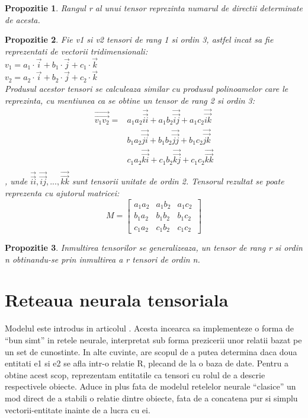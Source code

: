 \documentclass{article}
\newtheorem{prop}{Propozitie}[section]
\begin{document}
\begin{prop}
Rangul r al unui tensor reprezinta numarul de directii determinate de acesta. \cite{Tensor_Rank}
\end{prop}

\begin{prop}
	Fie v1 si v2 tensori de rang 1 si ordin 3, astfel incat sa fie reprezentati de vectorii tridimensionali:\\
	$v_1 = a_1 \cdot \vec{i} + b_1 \cdot \vec{j} + c_1 \cdot \vec{k}$\\
	$v_2 = a_2 \cdot \vec{i} + b_2 \cdot \vec{j} + c_2 \cdot \vec{k}$\\
	Produsul acestor tensori \cite{Tensor_Multiplication} se calculeaza similar cu produsul polinoamelor care le reprezinta, cu mentiunea ca se obtine un tensor de rang 2 si ordin 3:\\
\begin{align*}
	\overrightarrow{\overrightarrow{v_1 v_2}} = &a_1 a_2 \overrightarrow{\overrightarrow{ii}} + a_1 b_2 \overrightarrow{\overrightarrow{ij}} + a_1 c_2 \overrightarrow{\overrightarrow{ik}}\\
	&b_1 a_2 \overrightarrow{\overrightarrow{ji}} + b_1 b_2 \overrightarrow{\overrightarrow{jj}} + b_1 c_2 \overrightarrow{\overrightarrow{jk}}\\
	&c_1 a_2 \overrightarrow{\overrightarrow{ki}} + c_1 b_2 \overrightarrow{\overrightarrow{kj}} + c_1 c_2 \overrightarrow{\overrightarrow{kk}}\\
\end{align*}
, unde $\overrightarrow{\overrightarrow{ii}}, \overrightarrow{\overrightarrow{ij}},...,\overrightarrow{\overrightarrow{kk}}$ sunt tensorii unitate de ordin 2. Tensorul rezultat se poate reprezenta cu ajutorul matricei:\\
 \[
   M=
  \left[ {\begin{array}{ccc}
  	a_1 a_2	 & a_1 b_2 & a_1 c_2 \\
	b_1 a_2	 & b_1 b_2 & b_1 c_2 \\
	c_1 a_2	 & c_1 b_2 & c_1 c_2 \ 
  \end{array} } \right]
\]
\end{prop}

\begin{prop}
Inmultirea tensorilor se generalizeaza, un tensor de rang r si ordin n obtinandu-se prin inmultirea a r tensori de ordin n.
\end{prop}

\section{Reteaua neurala tensoriala}
Modelul este introdus in articolul \cite{NTN}. Acesta incearca sa implementeze o forma de ``bun simt'' in retele neurale, interpretat sub forma prezicerii unor relatii bazat pe un set de cunostinte. In alte cuvinte, are scopul de a putea determina daca doua entitati e1 si e2 se afla intr-o relatie R, plecand de la o baza de date. Pentru a obtine acest scop, reprezentam entitatile ca tensori cu rolul de a descrie respectivele obiecte. Aduce in plus fata de modelul retelelor neurale ``clasice'' un mod direct de a stabili o relatie dintre obiecte, fata de a concatena pur si simplu vectorii-entitate inainte de a lucra cu ei.
\end{document}
